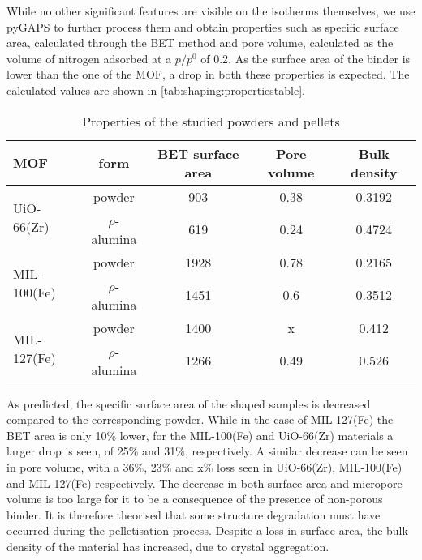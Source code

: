 While no other significant features are visible on the isotherms themselves,
we use pyGAPS to further process them and obtain properties
such as specific surface area, calculated through the BET method and pore
volume, calculated as the volume of nitrogen
adsorbed at a \(p/p^0\) of 0.2.
As the surface area of the binder is lower than the
one of the MOF, a drop in both these properties is expected.
The calculated values are shown in
\autoref{tab:shaping:propertiestable}.

\begin{table}[htb]
	\centering
	\caption{Properties of the studied powders and pellets}
	\begin{tabular}{lcccc}
		\toprule
		\textbf{MOF}
		                             & \textbf{form}
		                             & \textbf{BET surface area}
		                             & \textbf{Pore volume}
		                             & \textbf{Bulk density}                            \\
		\midrule
		\multirow{2}{*}{UiO-66(Zr)}  & powder                    & 903  & 0.38 & 0.3192 \\
		                             & \(\rho\)-alumina          & 619  & 0.24 & 0.4724 \\
		\multirow{2}{*}{MIL-100(Fe)} & powder                    & 1928 & 0.78 & 0.2165 \\
		                             & \(\rho\)-alumina          & 1451 & 0.6  & 0.3512 \\
		\multirow{2}{*}{MIL-127(Fe)} & powder                    & 1400 & x    & 0.412  \\
		                             & \(\rho\)-alumina          & 1266 & 0.49 & 0.526  \\
		\bottomrule
	\end{tabular}%
	\label{tab:shaping:propertiestable}
\end{table}%

As predicted, the specific surface area of the shaped samples is
decreased compared to the corresponding powder. While in the case
of MIL-127(Fe) the BET area is only 10\% lower, for the MIL-100(Fe)
and UiO-66(Zr) materials a larger drop is seen, of 25\% and 31\%,
respectively.
A similar decrease can be seen in pore volume,
with a 36\%, 23\% and x\% loss seen
in UiO-66(Zr), MIL-100(Fe) and MIL-127(Fe) respectively.
The decrease in both surface area and micropore volume is
too large for it to be a consequence of the presence of non-porous binder.
It is therefore theorised that some structure degradation must have
occurred during the pelletisation process.
Despite a loss in surface area, the bulk density of the material
has increased, due to crystal aggregation. 
